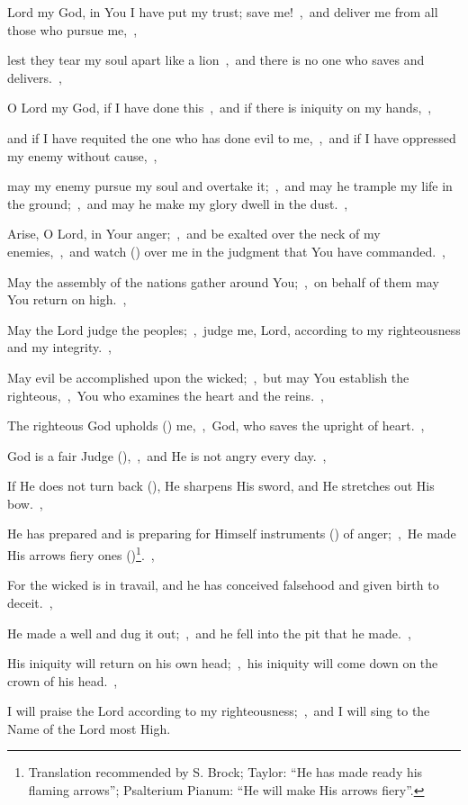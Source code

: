 \documentclass[12pt,twoside,a5paper]{article}
\begin{document}
\begin{normalparskip}
  Lord my God, in You I have put my trust; save me!~\sep\ and deliver me from all those who pursue me,~\sep


  lest they tear my soul apart like a lion~\sep\ and there is no one who saves and delivers.~\sep

  O Lord my God, if I have done this~\sep\ and if there is iniquity on my hands,~\sep

  and if I have requited the one who has done evil to me,~\sep\ and if I have oppressed my enemy without cause,~\sep

  may my enemy pursue my soul and overtake it;~\sep\ and may he trample my life in the ground;~\sep\ and may he make my glory dwell in the dust.~\sep

  Arise, O Lord, in Your anger;~\sep\ and be exalted over the neck of my enemies,~\sep\ and watch () over me in the judgment that You have commanded.~\sep

  May the assembly of the nations gather around You;~\sep\ on behalf of them may You return on high.~\sep

  May the Lord judge the peoples;~\sep\ judge me, Lord, according to my righteousness and my integrity.~\sep

  May evil be accomplished upon the wicked;~\sep\ but may You establish the righteous,~\sep\ You who examines the heart and the reins.~\sep

  The righteous God upholds () me,~\sep\ God, who saves the upright of heart.~\sep

  God is a fair Judge (),~\sep\ and He is not angry every day.~\sep

  If He does not turn back (), He sharpens His sword, and He stretches out His bow.~\sep

  He has prepared and is preparing for Himself instruments () of anger;~\sep\ He made His arrows fiery ones ()\footnote{Translation recommended by S. Brock; Taylor: ``He has made ready his flaming arrows''; Psalterium Pianum: ``He will make His arrows fiery''.}.~\sep

  For the wicked is in travail, and he has conceived falsehood and given birth to deceit.~\sep

  He made a well and dug it out;~\sep\ and he fell into the pit that he made.~\sep

  His iniquity will return on his own head;~\sep\ his iniquity will come down on the crown of his head.~\sep

  I will praise the Lord according to my righteousness;~\sep\ and I will sing to the Name of the Lord most High.
\end{normalparskip}
\end{document}
